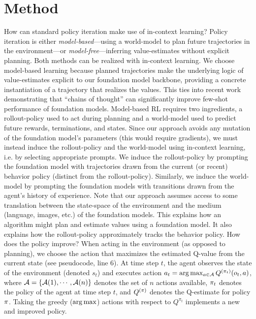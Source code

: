 \documentclass{article}
\begin{document}
\section{Method}
\label{sec:algorithm}
How can standard policy iteration make use of in-context learning? Policy
iteration is either \textit{model-based}---using a world-model to plan future
trajectories in the environment---or \textit{model-free}---inferring
value-estimates without explicit planning. Both methods can be realized with
in-context learning. We choose model-based learning because planned trajectories
make the underlying logic of value-estimates explicit to our foundation model
backbone, providing a concrete instantiation of a trajectory that realizes the
values. This ties into recent work
\parencite{wei_chain_2022,nye_show_2021}
demonstrating that ``chains of thought'' can significantly improve few-shot
performance of foundation models.
Model-based RL requires two ingredients, a rollout-policy used to act during
planning and a world-model used to predict future rewards, terminations, and
states. Since our approach avoids any mutation of the foundation model's
parameters (this would require gradients), we must instead induce the
rollout-policy and the world-model using in-context learning, i.e. by selecting
appropriate prompts. We induce the rollout-policy by prompting the foundation
model with trajectories drawn from the current (or recent) behavior policy
(distinct from the rollout-policy). Similarly, we induce the world-model by
prompting the foundation models with transitions drawn from the agent's history
of experience. Note that our approach assumes access to some translation between
the state-space of the environment and the medium (language, images, etc.) of
the foundation models. This explains how an algorithm might plan and estimate
values using a foundation model. It also explains how the rollout-policy
approximately tracks the behavior policy.
How does the policy improve? When acting in the environment (as opposed to
planning), we choose the action that maximizes the estimated Q-value from the
current state (see  pseudocode, line 6). At time step $t$,
the agent observes the state of the environment (denoted $s_t$) and executes
action $a_t = \argmax_{\Act \in \Actions} \Q^{\Policy_t}(\Obs_t,\Act)$,
where $\mathcal{A} = \{\mathcal{A}(1),\cdots,\mathcal{A}(n)\}$ denotes the set of $n$
actions available, $\Policy_t$ denotes the policy of the agent at time step $t$,
and $\Q^{\Policy}$ denotes the Q-estimate for policy $\Policy$. Taking the
greedy ($\arg\max$) actions with respect to $Q^{\pi_t}$ implements a new and
improved policy.
\end{document}
